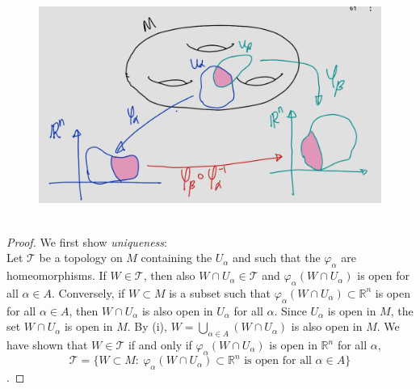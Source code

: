 \documentclass[
]{book}
\theoremstyle{definition}
\theoremstyle{definition}
\theoremstyle{definition}
\theoremstyle{definition}
\theoremstyle{remark}
\begin{document}
\begin{figure}
\centering
\includegraphics{figures/ch1/fig09.png}
\caption{\label{fig:fig09}\(~\)}
\end{figure}

\begin{proof}
We first show \emph{uniqueness}:\\
Let \(\mathcal{T}\) be a topology on \(M\) containing the \(U_\alpha\) and such that the \(\varphi_\alpha\) are homeomorphisms.
If \(W \in \mathcal{T}\), then also \(W \cap U_\alpha \in \mathcal{T}\) and \(\varphi_\alpha(W \cap U_\alpha)\) is open for all \(\alpha \in A\).
Conversely, if \(W \subset M\) is a subset such that \(\varphi_\alpha(W \cap U_\alpha) \subset \mathbb{R}^n\) is open for all \(\alpha \in A\), then
\(W \cap U_\alpha\) is also open in \(U_\alpha\) for all \(\alpha\). Since \(U_\alpha\) is open in \(M\), the set \(W \cap U_\alpha\) is open in \(M\).
By (i), \(W = \bigcup_{\alpha \in A} (W \cap U_\alpha)\) is also open in \(M\). We have shown that \(W \in \mathcal{T}\) if and only
if \(\varphi_\alpha(W \cap U_\alpha)\) is open in \(\mathbb{R}^n\) for all \(\alpha\),
\[\mathcal{T} = \{W \subset M :~ \varphi_\alpha(W \cap U_\alpha) \subset \mathbb{R}^n \text{ is open for all } \alpha \in A\}\].
\end{proof}

  
\end{document}
